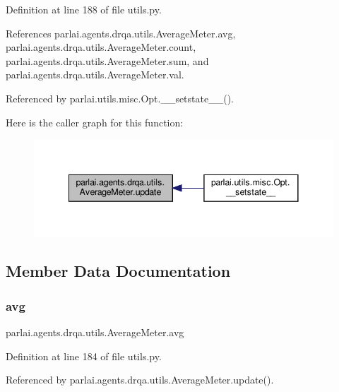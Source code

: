 Definition at line 188 of file utils.\+py.



References parlai.\+agents.\+drqa.\+utils.\+Average\+Meter.\+avg, parlai.\+agents.\+drqa.\+utils.\+Average\+Meter.\+count, parlai.\+agents.\+drqa.\+utils.\+Average\+Meter.\+sum, and parlai.\+agents.\+drqa.\+utils.\+Average\+Meter.\+val.



Referenced by parlai.\+utils.\+misc.\+Opt.\+\_\+\+\_\+setstate\+\_\+\+\_\+().

Here is the caller graph for this function\+:
\nopagebreak
\begin{figure}[H]
\begin{center}
\leavevmode
\includegraphics[width=341pt]{classparlai_1_1agents_1_1drqa_1_1utils_1_1AverageMeter_a5a66f2a884034fcdf004468a980d1318_icgraph}
\end{center}
\end{figure}


\subsection{Member Data Documentation}
\mbox{\label{classparlai_1_1agents_1_1drqa_1_1utils_1_1AverageMeter_aee254ce04bba670cb5839d0d8b602906}} 
\subsubsection{\texorpdfstring{avg}{avg}}
{\footnotesize\ttfamily parlai.\+agents.\+drqa.\+utils.\+Average\+Meter.\+avg}



Definition at line 184 of file utils.\+py.



Referenced by parlai.\+agents.\+drqa.\+utils.\+Average\+Meter.\+update().

